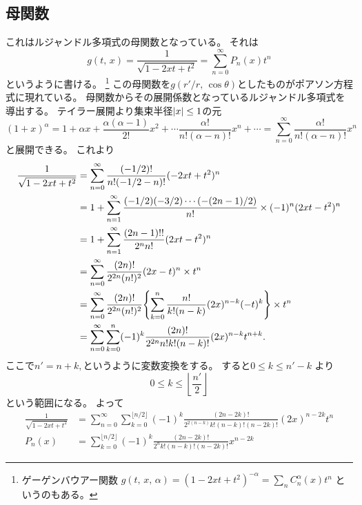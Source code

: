 \documentclass[../../master.tex]{subfiles}
\begin{document}
\subsection{母関数}
これはルジャンドル多項式の母関数となっている。
それは
\begin{equation}
	g(t,\,x) = \frac{1}{\sqrt{1-2xt+t^2}} = \sum_{n=0}^{\infty}P_n(x)t^n
\end{equation}
というように書ける。
\footnote{
ゲーゲンバウアー関数
\(g(t,\,x,\,\alpha) = (1-2xt+t^2)^{-\alpha}=\sum_n C_n^{\alpha}(x)t^n\)
というのもある。
}
この母関数を\(g(r'/r,\,\cos\theta)\)としたものがポアソン方程式に現れている。
母関数からその展開係数となっているルジャンドル多項式を導出する。
テイラー展開より集束半径\(\abs{x}\leq1\)の元
\begin{equation}
	(1+x)^\alpha = 1 + \alpha x + \frac{\alpha(\alpha-1)}{2!}x^2+\cdots\frac{\alpha !}{n! (\alpha-n)!}x^n + \cdots
	= \sum_{n=0}^{\infty} \frac{\alpha !}{n! (\alpha-n)!}x^n
\end{equation}
と展開できる。
これより
\begin{equation}\begin{aligned}[b]
    \frac{1}{\sqrt{1-2xt+t^2}} & = \sum_{n=0}^{\infty} \frac{(-1/2)!}{n!(-1/2-n)!}(-2xt+t^2)^n                                                     \\
	                           & = 1+\sum_{n=1}^{\infty} \frac{(-1/2)(-3/2)\cdots(-(2n-1)/2)}{n!}\times(-1)^n(2xt-t^2)^n                           \\
	                           & = 1+\sum_{n=1}^{\infty} \frac{(2n-1)!!}{2^n n!}(2xt-t^2)^n                                                        \\
	                           & = \sum_{n=0}^{\infty} \frac{(2n)!}{2^{2n}(n!)^2}(2x-t)^n \times t^n                                               \\
	                           & = \sum_{n=0}^{\infty} \frac{(2n)!}{2^{2n}(n!)^2}\qty{\sum_{k=0}^{n}\frac{n!}{k!(n-k)}(2x)^{n-k}(-t)^k} \times t^n \\
	                           & = \sum_{n=0}^{\infty}\sum_{k=0}^{n}(-1)^k \frac{(2n)!}{2^{2n}n!k!(n-k)!}(2x)^{n-k}t^{n+k}.
\end{aligned}\end{equation}
ここで\(n' = n+k,\)というように変数変換をする。
すると\(0 \leq k \leq n' -k\) より
\begin{equation}
	0 \leq k \leq \left\lfloor \frac{n'}{2} \right\rfloor
\end{equation}
という範囲になる。
よって
\begin{align}
	\frac{1}{\sqrt{1-2xt+t^2}}
	       & = \sum_{n=0}^{\infty}\sum_{k=0}^{\lfloor n/2 \rfloor}(-1)^k \frac{(2n-2k)!}{2^{2(n-k)}k!(n-k)!(n-2k)!}(2x)^{n-2k}t^{n} \\
	P_n(x) & = \sum_{k=0}^{\lfloor n/2 \rfloor}(-1)^k \frac{(2n-2k)!}{2^n k!(n-k)!(n-2k)!}x^{n-2k}
\end{align}
\end{document}
